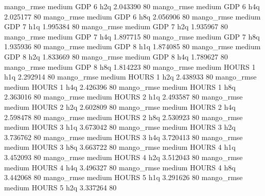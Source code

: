        mango_rmse     medium      GDP                 6                  h2q  2.043390 80
       mango_rmse     medium      GDP                 6                  h4q  2.025177 80
       mango_rmse     medium      GDP                 6                  h8q  2.056906 80
       mango_rmse     medium      GDP                 7                  h1q  1.995384 80
       mango_rmse     medium      GDP                 7                  h2q  1.935967 80
       mango_rmse     medium      GDP                 7                  h4q  1.897715 80
       mango_rmse     medium      GDP                 7                  h8q  1.935936 80
       mango_rmse     medium      GDP                 8                  h1q  1.874085 80
       mango_rmse     medium      GDP                 8                  h2q  1.833669 80
       mango_rmse     medium      GDP                 8                  h4q  1.789627 80
       mango_rmse     medium      GDP                 8                  h8q  1.814223 80
       mango_rmse     medium    HOURS                 1                  h1q  2.292914 80
       mango_rmse     medium    HOURS                 1                  h2q  2.438933 80
       mango_rmse     medium    HOURS                 1                  h4q  2.426396 80
       mango_rmse     medium    HOURS                 1                  h8q  2.363016 80
       mango_rmse     medium    HOURS                 2                  h1q  2.493587 80
       mango_rmse     medium    HOURS                 2                  h2q  2.602809 80
       mango_rmse     medium    HOURS                 2                  h4q  2.598478 80
       mango_rmse     medium    HOURS                 2                  h8q  2.530923 80
       mango_rmse     medium    HOURS                 3                  h1q  3.673042 80
       mango_rmse     medium    HOURS                 3                  h2q  3.736762 80
       mango_rmse     medium    HOURS                 3                  h4q  3.720413 80
       mango_rmse     medium    HOURS                 3                  h8q  3.663722 80
       mango_rmse     medium    HOURS                 4                  h1q  3.452093 80
       mango_rmse     medium    HOURS                 4                  h2q  3.512043 80
       mango_rmse     medium    HOURS                 4                  h4q  3.496327 80
       mango_rmse     medium    HOURS                 4                  h8q  3.442068 80
       mango_rmse     medium    HOURS                 5                  h1q  3.291626 80
       mango_rmse     medium    HOURS                 5                  h2q  3.337264 80

